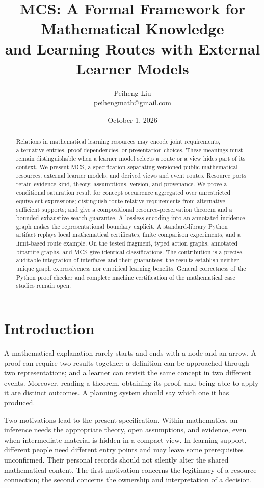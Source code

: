 \documentclass[11pt,a4paper]{article}
\title{MCS: A Formal Framework for Mathematical Knowledge\\
and Learning Routes with External Learner Models}
\author{Peiheng Liu\\\small\href{mailto:peihengmath@gmail.com}{peihengmath@gmail.com}}
\date{October 1, 2026}
\theoremstyle{remark}
\begin{document}
\maketitle
\begin{abstract}
Relations in mathematical learning resources may encode joint requirements,
alternative entries, proof dependencies, or presentation choices. These meanings
must remain distinguishable when a learner model selects a route or a view hides
part of its context. We present MCS, a specification separating versioned public
mathematical resources, external learner models, and derived views and event
routes. Resource ports retain evidence kind, theory, assumptions, version, and
provenance. We prove a conditional saturation result for concept occurrence
aggregated over unrestricted equivalent expressions; distinguish route-relative
requirements from alternative sufficient supports; and give a compositional
resource-preservation theorem and a bounded exhaustive-search guarantee.
A lossless encoding into an annotated incidence graph makes the representational
boundary explicit. A standard-library Python artifact replays local mathematical
certificates, finite comparison experiments, and a limit-based route example.
On the tested fragment, typed action graphs, annotated bipartite graphs, and MCS
give identical classifications. The contribution is a precise, auditable
integration of interfaces and their guarantees; the results establish neither
unique graph expressiveness nor empirical learning benefits. General correctness
of the Python proof checker and complete machine certification of the mathematical
case studies remain open.
\end{abstract}

\section{Introduction}\label{sec:intro}
A mathematical explanation rarely starts and ends with a node and an arrow.
A proof can require two results together; a definition can be approached
through two representations; and a learner can revisit the same concept in two
different events. Moreover, reading a theorem, obtaining its proof, and being
able to apply it are distinct outcomes. A planning system should say which one
it has produced.

Two motivations lead to the present specification. Within mathematics, an
inference needs the appropriate theory, open assumptions, and evidence, even
when intermediate material is hidden in a compact view. In learning support,
different people need different entry points and may leave some prerequisites
unconfirmed. Their personal records should not silently alter the shared
mathematical content. The first motivation concerns the legitimacy of a resource
connection; the second concerns the ownership and interpretation of a decision.
\end{document}
